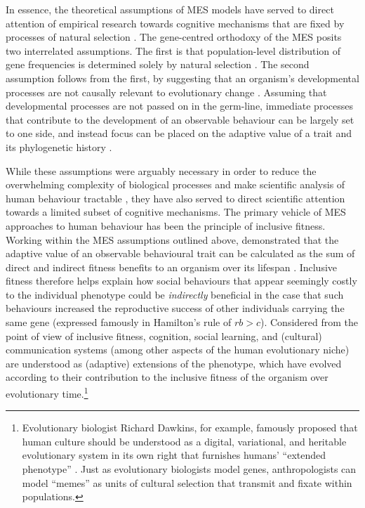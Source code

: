 \begin{CJK}{UTF8}{gbsn}
In essence, the theoretical assumptions of MES models have served to direct attention of empirical research towards cognitive mechanisms that are fixed by processes of natural selection \citep{Lickliter2003,Kenrick2001}.  The gene-centred orthodoxy of the MES posits two interrelated assumptions.  The first is that population-level distribution of gene frequencies is determined solely by natural selection \citep[including associated stochastic mechanisms of mutation, and genetic drift][]{Grafen1991}.  The second assumption follows from the first, by suggesting that an organism's developmental processes are not causally relevant to evolutionary change \citep[also known as the ``phenotypic gambit''; see][]{Grafen1984}.  Assuming that developmental processes are not passed on in the germ-line, immediate processes that contribute to the development of an observable behaviour can be largely set to one side, and instead focus can be placed on the adaptive value of a trait and its phylogenetic history \citep{Mayr1961,Dunbar1996}.

While these assumptions were arguably necessary in order to reduce the overwhelming complexity of biological processes and make scientific analysis of human behaviour tractable \citep{Mayr1961}, they have also served to direct scientific attention towards a limited subset of cognitive mechanisms.  The primary vehicle of MES approaches to human behaviour has been the principle of inclusive fitness. Working within the MES assumptions outlined above, \textcite{Hamilton1964} demonstrated that the adaptive value of an observable behavioural trait can be calculated as the sum of direct and indirect fitness benefits to an organism over its lifespan \citep{Grafen2006}.  Inclusive fitness therefore helps explain how social behaviours that appear seemingly costly to the individual phenotype could be \textit{indirectly} beneficial in the case that such behaviours increased the reproductive success of other individuals carrying the same gene (expressed famously in Hamilton's rule of $rb > c$).  Considered from the point of view of inclusive fitness, cognition, social learning, and (cultural) communication systems (among other aspects of the human evolutionary niche) are understood as (adaptive) extensions of the phenotype, which have evolved according to their contribution to the inclusive fitness of the organism over evolutionary time.\footnote{Evolutionary biologist Richard Dawkins, for example, famously proposed that human culture should be understood as a digital, variational, and heritable evolutionary system in its own right that furnishes humans' ``extended phenotype'' \citep{Dawkins1982}.  Just as evolutionary biologists model genes, anthropologists can model ``memes'' as units of cultural selection that transmit and fixate within populations.}


\end{CJK}
